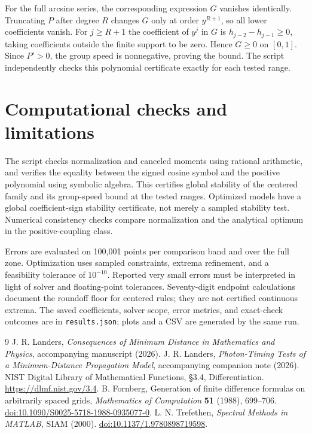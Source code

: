 \documentclass[11pt]{article}
\begin{document}
For the full arcsine series, the corresponding expression $G$ vanishes identically. Truncating $P$ after degree $R$ changes $G$ only at order $y^{R+1}$, so all lower coefficients vanish. For $j\geq R+1$ the coefficient of $y^j$ in $G$ is $h_{j-2}-h_{j-1}\geq0$, taking coefficients outside the finite support to be zero. Hence $G\geq0$ on $[0,1]$. Since $P'>0$, the group speed is nonnegative, proving the bound. The script independently checks this polynomial certificate exactly for each tested range.

\section{Computational checks and limitations}
The script checks normalization and canceled moments using rational arithmetic, and verifies the equality between the signed cosine symbol and the positive polynomial using symbolic algebra. This certifies global stability of the centered family and its group-speed bound at the tested ranges. Optimized models have a global coefficient-sign stability certificate, not merely a sampled stability test. Numerical consistency checks compare normalization and the analytical optimum in the positive-coupling class.

Errors are evaluated on 100,001 points per comparison band and over the full zone. Optimization uses sampled constraints, extrema refinement, and a feasibility tolerance of $10^{-10}$. Reported very small errors must be interpreted in light of solver and floating-point tolerances. Seventy-digit endpoint calculations document the roundoff floor for centered rules; they are not certified continuous extrema. The saved coefficients, solver scope, error metrics, and exact-check outcomes are in \texttt{results.json}; plots and a CSV are generated by the same run.

\begin{thebibliography}{9}
\small
{} J. R. Landers, \emph{Consequences of Minimum Distance in Mathematics and Physics}, accompanying manuscript (2026).
 J. R. Landers, \emph{Photon-Timing Tests of a Minimum-Distance Propagation Model}, accompanying companion note (2026).
 NIST Digital Library of Mathematical Functions, \S3.4, Differentiation. \url{https://dlmf.nist.gov/3.4}.
 B. Fornberg, Generation of finite difference formulas on arbitrarily spaced grids, \emph{Mathematics of Computation} \textbf{51} (1988), 699--706. \href{https://doi.org/10.1090/S0025-5718-1988-0935077-0}{doi:10.1090/S0025-5718-1988-0935077-0}.
 L. N. Trefethen, \emph{Spectral Methods in MATLAB}, SIAM (2000). \href{https://doi.org/10.1137/1.9780898719598}{doi:10.1137/1.9780898719598}.
\end{thebibliography}
\end{document}
